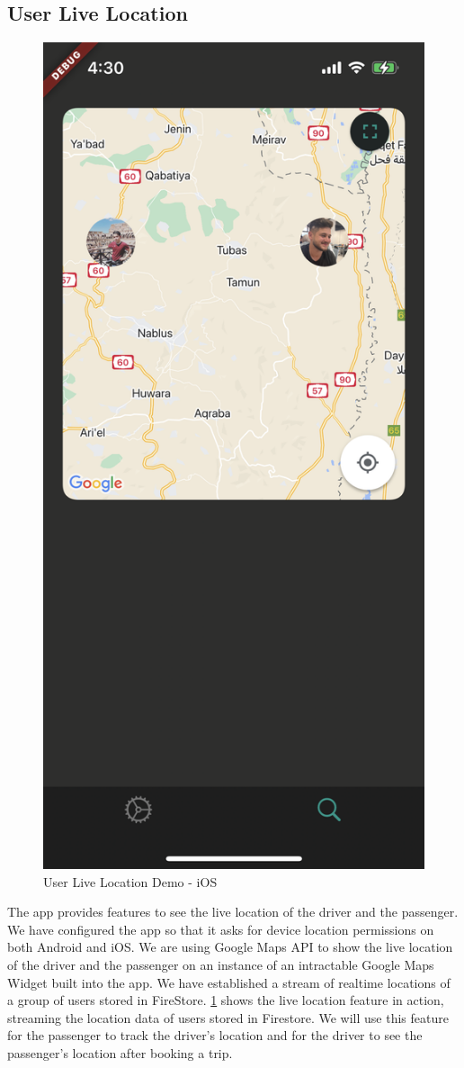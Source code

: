 \documentclass[a4paper, 12pt]{report} %
\begin{document}
            \FloatBarrier

        \subsection{User Live Location}

            \begin{figure}
                \centering
                \includegraphics[width=0.65\linewidth]{Images/live_location.png}
                \caption{User Live Location Demo - iOS}
                \label{fig:live_location_demo}
            \end{figure}
            
            The app provides features to see the live location of the driver and the passenger. We have configured the app so that it asks for device location permissions on both Android and iOS. We are using Google Maps API to show the live location of the driver and the passenger on an instance of an intractable Google Maps Widget built into the app. We have established a stream of realtime locations of a group of users stored in FireStore. \ref{fig:live_location_demo} shows the live location feature in action, streaming the location data of users stored in Firestore. We will use this feature for the passenger to track the driver's location and for the driver to see the passenger's location after booking a trip.
       
\end{document}
